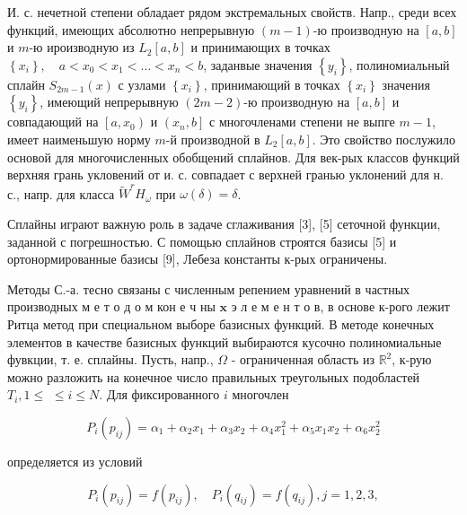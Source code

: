 \documentclass[10pt]{article}
\begin{document}
И. с. нечетной степени обладает рядом экстремальных свойств. Напр., среди всех функций, имеющих абсолютно непрерывную $(m-1)$-ю производную на $[a, b]$ и $m$-ю ироизводную из $L_{2}[a, b]$ и принимающих в точках $\left\{x_{i}\right\}, \quad a<x_{0}<x_{1}<\ldots<x_{n}<b$, заданвые значения $\left\{y_{i}\right\}$, полиномиальный сплайн $S_{2 m-1}(x)$ с узлами $\left\{x_{i}\right\}$, принимающий в точках $\left\{x_{i}\right\}$ значения $\left\{y_{i}\right\}$, имеющий непрерывную $(2 m-2)$-ю производную на $[a, b]$ и совпадающий на $\left[a, x_{0}\right)$ и $\left(x_{n}, b\right]$ с многочленами степени не выпге $m-1$, имеет наименьшую норму $m$-й производной в $L_{2}[a, b]$. Это свойство послужило основой для многочисленных обобщений сплайнов. Для век-рых классов функций верхняя грань укловений от и. с. совпадает с верхней гранью уклонений для н. с., напр. для класса $\tilde{W}^{r} H_{\omega}$ при $\omega(\delta)=\delta$.



Сплайны играют важную роль в задаче сглаживания [3], [5] сеточной функции, заданной с погрешностью. С помощью сплайнов строятся базисы [5] и ортонормированные базисы [9], Лебеза константы к-рых ограничены.



Методы С.-а. тесно связаны с численным репением уравнений в частных производных м е т о д о м кон е ч ны $\mathbf{x}$ э л е м е н т о в, в основе к-рого лежит Ритца метод при специальном выборе базисных функций. В методе конечных элементов в качестве базисных функций выбираются кусочно полиномиальные фувкции, т. е. сплайны. Пусть, напр., $\Omega$ - ограниченная область из $\mathbb{R}^{2}$, к-рую можно разложить на конечное число правильных треугольных подобластей $T_{i}, 1 \leqslant$ $\leqslant i \leqslant N$. Для фиксированного $i$ многочлен



\[

P_{i}\left(p_{i j}\right)=\alpha_{1}+\alpha_{2} x_{1}+\alpha_{3} x_{2}+\alpha_{4} x_{1}^{2}+\alpha_{5} x_{1} x_{2}+\alpha_{6} x_{2}^{2}

\]



определяется из условий



\[

P_{i}\left(p_{i j}\right)=f\left(p_{i j}\right), \quad P_{i}\left(q_{i j}\right)=f\left(q_{i j}\right), j=1,2,3,

\]
\end{document}
